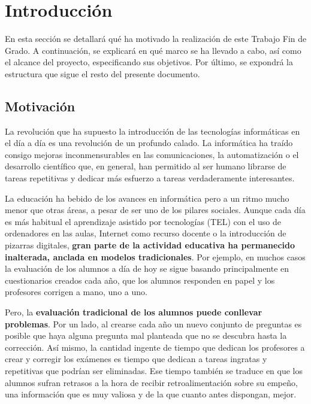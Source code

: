 \chapter{Introducción \label{sec:introduccion}}

En esta sección se detallará qué ha motivado la realización de este Trabajo Fin de Grado. A continuación, se explicará en qué marco se ha llevado a cabo, así como el alcance del proyecto, especificando sus objetivos. Por último, se expondrá  la estructura que sigue el resto del presente documento.

\section{Motivación}


La revolución que ha supuesto la introducción de las tecnologías informáticas en el día a día es una revolución de un profundo calado. La informática ha traído consigo mejoras inconmensurables en las comunicaciones, la automatización o el desarrollo científico que, en general, han permitido al ser humano librarse de tareas repetitivas y dedicar más esfuerzo a tareas verdaderamente interesantes.

La educación ha bebido de los avances en informática pero a un ritmo mucho menor que otras áreas, a pesar de ser uno de los pilares sociales. Aunque cada día es más habitual el aprendizaje asistido por tecnologías (\acrshort{TEL}) con el uso de ordenadores en las aulas, Internet como recurso docente o la introducción de pizarras digitales, \textbf{gran parte de la actividad educativa ha permanecido inalterada, anclada en modelos tradicionales}. Por ejemplo, en muchos casos la evaluación de los alumnos a día de hoy se sigue basando principalmente en cuestionarios creados cada año, que los alumnos responden en papel y los profesores corrigen a mano, uno a uno.

Pero, la \textbf{evaluación tradicional de los alumnos puede conllevar problemas}. Por un lado, al crearse cada año un nuevo conjunto de preguntas es posible que haya alguna pregunta mal planteada que no se descubra hasta la corrección. Así mismo, la cantidad ingente de tiempo que dedican los profesores a crear y corregir los exámenes es tiempo que dedican a tareas ingratas y repetitivas que podrían ser eliminadas. Ese tiempo también se traduce en que los alumnos sufran retrasos a la hora de recibir retroalimentación sobre su empeño, una información que es muy valiosa y de la que cuanto antes dispongan, mejor.

